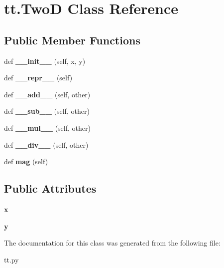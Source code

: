 \hypertarget{classtt_1_1_two_d}{}\section{tt.\+TwoD Class Reference}
\label{classtt_1_1_two_d}
\subsection*{Public Member Functions}
\begin{DoxyCompactItemize}
\item 
\mbox{\label{classtt_1_1_two_d_a9e768c02e6aae6b24c0ba723434ca2b3}} 
def {\bfseries \+\_\+\+\_\+init\+\_\+\+\_\+} (self, x, y)
\item 
\mbox{\label{classtt_1_1_two_d_a57caa682a7f96df81ab82cfd9abebcc5}} 
def {\bfseries \+\_\+\+\_\+repr\+\_\+\+\_\+} (self)
\item 
\mbox{\label{classtt_1_1_two_d_a8a8d52c8f81d0e19c0dd6b1d23a4e97f}} 
def {\bfseries \+\_\+\+\_\+add\+\_\+\+\_\+} (self, other)
\item 
\mbox{\label{classtt_1_1_two_d_a2fb9e8cf3fcf1357e659869464f366bf}} 
def {\bfseries \+\_\+\+\_\+sub\+\_\+\+\_\+} (self, other)
\item 
\mbox{\label{classtt_1_1_two_d_afe04f53a8bcdb9511b0e7f648a5135c4}} 
def {\bfseries \+\_\+\+\_\+mul\+\_\+\+\_\+} (self, other)
\item 
\mbox{\label{classtt_1_1_two_d_a0208af36f779f3c62e594e745698a423}} 
def {\bfseries \+\_\+\+\_\+div\+\_\+\+\_\+} (self, other)
\item 
\mbox{\label{classtt_1_1_two_d_a750ef8cf766ee596ba04b6d0c7a60ee9}} 
def {\bfseries mag} (self)
\end{DoxyCompactItemize}
\subsection*{Public Attributes}
\begin{DoxyCompactItemize}
\item 
\mbox{\label{classtt_1_1_two_d_a40275dbb15e3a11b5893a0a6d9ed8d85}} 
{\bfseries x}
\item 
\mbox{\label{classtt_1_1_two_d_ab032f48f2214467cda59eb0653bdb491}} 
{\bfseries y}
\end{DoxyCompactItemize}


The documentation for this class was generated from the following file\+:\begin{DoxyCompactItemize}
\item 
tt.\+py\end{DoxyCompactItemize}
